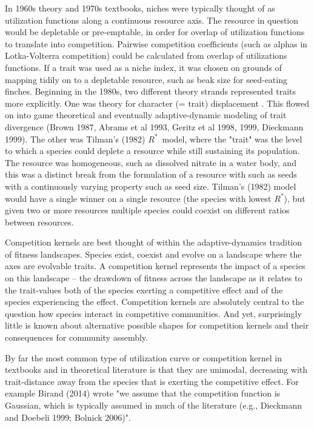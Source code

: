 \documentclass[a4paper,11pt]{article}
\newcommand{\Rstar}{\ensuremath{R^*}}
\begin{document}
In 1960s theory and 1970s textbooks, niches were typically thought of as utilization functions along a continuous resource axis. The resource in question would be depletable or pre-emptable, in order for overlap of utilization functions to translate into competition. Pairwise competition coefficients (such as alphas in Lotka-Volterra competition) could be calculated from overlap of utilizations functions. If a trait was used as a niche index, it was chosen on grounds of mapping tidily on to a depletable resource, such as beak size for seed-eating finches. Beginning in the 1980s, two different theory strands represented traits more explicitly. One was theory for character (= trait) displacement \citep[e.g.,][]{Taper-1985, Case-2000,   Goldberg-2006}. This flowed on into game theoretical and eventually adaptive-dynamic modeling of trait divergence (Brown 1987, Abrams et al 1993, Geritz et al 1998, 1999, Dieckmann 1999). The other was Tilman's (1982) \Rstar\ model, where the "trait" was the level to which a species could deplete a resource while still sustaining its population. The resource was homogeneous, such as dissolved nitrate in a water body, and this was a distinct break from the formulation of a resource with such as seeds with a continuously varying property such as seed size. Tilman's (1982) model would have a single winner on a single resource (the species with lowest \Rstar), but given two or more resources multiple species could coexist on different ratios between resources.


Competition kernels are best thought of within the adaptive-dynamics tradition of fitness landscapes. Species exist, coexist and evolve on a landscape where the axes are evolvable traits. A competition kernel represents the impact of a species on this landscape -- the drawdown of fitness across the landscape as it relates to the trait-values both of the species exerting a competitive effect and of the species experiencing the effect. Competition kernels are absolutely central to the question how species interact in competitive communities. And yet, surprisingly little is known about alternative possible shapes for competition kernels and their consequences for community assembly.

By far the most common type of utilization curve or competition kernel in textbooks and in theoretical literature is that they are unimodal, decreasing with trait-distance away from the species that is exerting the competitive effect. For example Birand (2014) wrote "we assume that the competition function is Gaussian, which is typically assumed in much of the literature (e.g., Dieckmann and Doebeli 1999; Bolnick 2006)".
\end{document}
